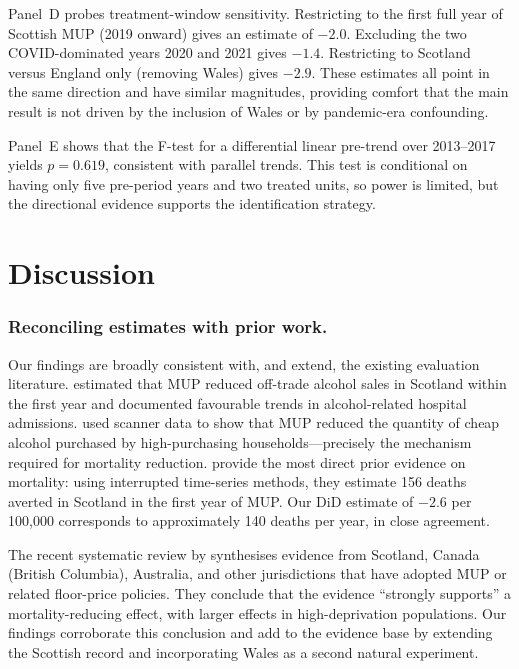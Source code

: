 \documentclass[12pt]{article}
\begin{document}
Panel~D probes treatment-window sensitivity. Restricting to the first full year of Scottish MUP (2019 onward) gives an estimate of $-2.0$. Excluding the two COVID-dominated years 2020 and 2021 gives $-1.4$. Restricting to Scotland versus England only (removing Wales) gives $-2.9$. These estimates all point in the same direction and have similar magnitudes, providing comfort that the main result is not driven by the inclusion of Wales or by pandemic-era confounding.

Panel~E shows that the F-test for a differential linear pre-trend over 2013--2017 yields $p = 0.619$, consistent with parallel trends. This test is conditional on having only five pre-period years and two treated units, so power is limited, but the directional evidence supports the identification strategy.



\section{Discussion}
\label{sec:discussion}

\subsubsection*{Reconciling estimates with prior work.} Our findings are broadly consistent with, and extend, the existing evaluation literature. \citet{ODonnell2019} estimated that MUP reduced off-trade alcohol sales in Scotland within the first year and documented favourable trends in alcohol-related hospital admissions. \citet{Griffith2022} used scanner data to show that MUP reduced the quantity of cheap alcohol purchased by high-purchasing households---precisely the mechanism required for mortality reduction. \citet{Giles2024} provide the most direct prior evidence on mortality: using interrupted time-series methods, they estimate 156 deaths averted in Scotland in the first year of MUP. Our DiD estimate of $-2.6$ per 100,000 corresponds to approximately 140 deaths per year, in close agreement.

The recent systematic review by \citet{Buykx2025} synthesises evidence from Scotland, Canada (British Columbia), Australia, and other jurisdictions that have adopted MUP or related floor-price policies. They conclude that the evidence ``strongly supports'' a mortality-reducing effect, with larger effects in high-deprivation populations. Our findings corroborate this conclusion and add to the evidence base by extending the Scottish record and incorporating Wales as a second natural experiment.
\end{document}
